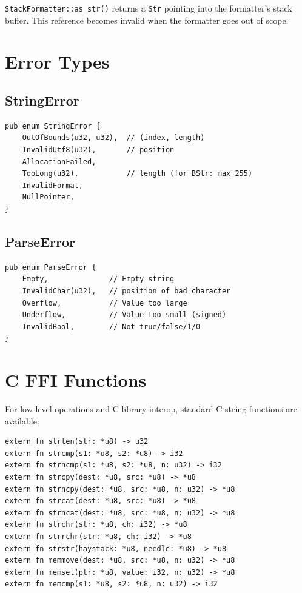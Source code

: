 \begin{warningbox}
\texttt{StackFormatter::as\_str()} returns a \texttt{Str} pointing into the formatter's stack buffer. This reference becomes invalid when the formatter goes out of scope.
\end{warningbox}

\section{Error Types}
\label{sec:string-errors}

\subsection{StringError}

\begin{lstlisting}
pub enum StringError {
    OutOfBounds(u32, u32),  // (index, length)
    InvalidUtf8(u32),       // position
    AllocationFailed,
    TooLong(u32),           // length (for BStr: max 255)
    InvalidFormat,
    NullPointer,
}
\end{lstlisting}

\subsection{ParseError}

\begin{lstlisting}
pub enum ParseError {
    Empty,              // Empty string
    InvalidChar(u32),   // position of bad character
    Overflow,           // Value too large
    Underflow,          // Value too small (signed)
    InvalidBool,        // Not true/false/1/0
}
\end{lstlisting}

\section{C FFI Functions}
\label{sec:string-ffi}

For low-level operations and C library interop, standard C string functions are available:

\begin{lstlisting}
extern fn strlen(str: *u8) -> u32
extern fn strcmp(s1: *u8, s2: *u8) -> i32
extern fn strncmp(s1: *u8, s2: *u8, n: u32) -> i32
extern fn strcpy(dest: *u8, src: *u8) -> *u8
extern fn strncpy(dest: *u8, src: *u8, n: u32) -> *u8
extern fn strcat(dest: *u8, src: *u8) -> *u8
extern fn strncat(dest: *u8, src: *u8, n: u32) -> *u8
extern fn strchr(str: *u8, ch: i32) -> *u8
extern fn strrchr(str: *u8, ch: i32) -> *u8
extern fn strstr(haystack: *u8, needle: *u8) -> *u8
extern fn memmove(dest: *u8, src: *u8, n: u32) -> *u8
extern fn memset(ptr: *u8, value: i32, n: u32) -> *u8
extern fn memcmp(s1: *u8, s2: *u8, n: u32) -> i32
\end{lstlisting}

